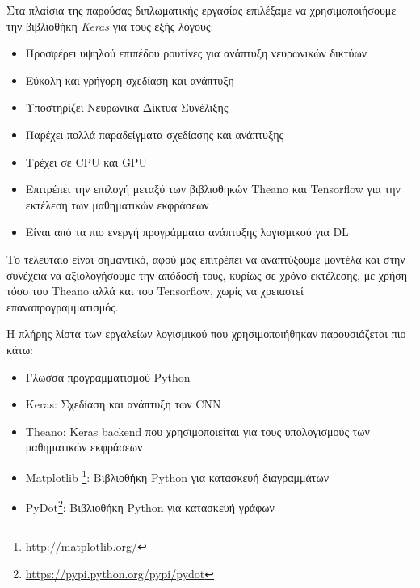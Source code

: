 Στα πλαίσια της παρούσας διπλωματικής εργασίας επιλέξαμε να χρησιμοποιήσουμε
την βιβλιοθήκη \emph{Keras} για τους εξής λόγους:
\begin{itemize}
  \item{Προσφέρει υψηλού επιπέδου ρουτίνες για ανάπτυξη νευρωνικών δικτύων}
  \item{Εύκολη και γρήγορη σχεδίαση και ανάπτυξη}
  \item{Υποστηρίζει Νευρωνικά Δίκτυα Συνέλιξης}
  \item{Παρέχει πολλά παραδείγματα σχεδίασης και ανάπτυξης}
  \item{Τρέχει σε CPU και GPU}
  \item{Επιτρέπει την επιλογή μεταξύ των βιβλιοθηκών Theano και Tensorflow
    για την εκτέλεση των μαθηματικών εκφράσεων}
  \item{Είναι από τα πιο ενεργή προγράμματα ανάπτυξης λογισμικού για DL}
\end{itemize}

Το τελευταίο είναι σημαντικό, αφού μας επιτρέπει να αναπτύξουμε μοντέλα
και στην συνέχεια να αξιολογήσουμε την απόδοσή τους, κυρίως σε χρόνο εκτέλεσης,
με χρήση τόσο του Theano αλλά και του Tensorflow, χωρίς να χρειαστεί
επαναπρογραμματισμός.

Η πλήρης λίστα των εργαλείων λογισμικού που χρησιμοποιήθηκαν παρουσιάζεται πιο κάτω:
\begin{itemize}
  \item{Γλωσσα προγραμματισμού Python}
  \item{Keras: Σχεδίαση και ανάπτυξη των CNN}
  \item{Theano: Keras backend που χρησιμοποιείται για τους υπολογισμούς των μαθηματικών εκφράσεων}
  \item{Matplotlib \footnote{\href{http://matplotlib.org/}{http://matplotlib.org/}}: Βιβλιοθήκη Python για κατασκευή διαγραμμάτων}
  \item{PyDot\footnote{\href{https://pypi.python.org/pypi/pydot}{https://pypi.python.org/pypi/pydot}}: Βιβλιοθήκη Python για κατασκευή γράφων}
\end{itemize}
